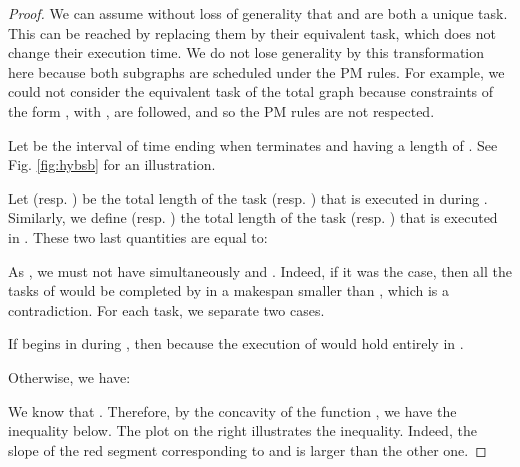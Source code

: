 \documentclass{llncs}
\begin{document}
\begin{proof}
We can assume without loss of generality that  and  are both a unique task. This can be reached by replacing them by their equivalent task, which does not change their execution time. We do not lose generality by this transformation here because both subgraphs are scheduled under the PM rules. For example, we could not consider the equivalent task of the total graph  because constraints of the form , with ,  are followed, and so the PM rules are not respected.


Let  be the interval of time ending when  terminates and having a length of . See Fig. \ref{fig:hybsb} for an illustration.

Let  (resp. ) be the total length of the task  (resp. ) that is executed in  during . Similarly, we define  (resp. ) the total length of the task  (resp. ) that is executed in . These two last quantities are equal to:




As , we must not have simultaneously  and . Indeed, if it was the case, then all the tasks of  would be completed by  in a makespan smaller than , which is a contradiction.
For each task, we separate two cases.

If  begins in  during , then  because the execution of  would hold entirely in .

Otherwise, we have:


We know that . 
Therefore, by the concavity of the function , we have the inequality below. The plot on the right illustrates the inequality. Indeed, the slope of the red segment corresponding to  and  is larger than the other one.

\vspace{.25em}

\begin{minipage}{.36\columnwidth}

\end{minipage}
\begin{minipage}{.58\columnwidth}
\tikzset{
xmin/.store in=\xmin, xmin/.default=-3, xmin=-3,
xmax/.store in=\xmax, xmax/.default=3, xmax=3,
ymin/.store in=\ymin, ymin/.default=-3, ymin=-3,
ymax/.store in=\ymax, ymax/.default=3, ymax=3,
}
\newcommand {\grille}
{\draw[help lines, dashed] (.001,.001) grid (1,1);}
\newcommand {\axes} {
\draw[->] (\xmin,0) -- (\xmax,0);
\draw[->] (0,\ymin) -- (0,\ymax);
}
\newcommand {\fenetre}
{\clip (\xmin,\ymin) rectangle (\xmax,\ymax);}
\newcommand{\fx}[1]{3*#1^3}
\newcommand{\ux}{.4}
\newcommand{\ubx}{.53}
\newcommand{\vbx}{.85}
\newcommand{\vx}{.95}
\end{minipage}
\end{proof}
\end{document}
